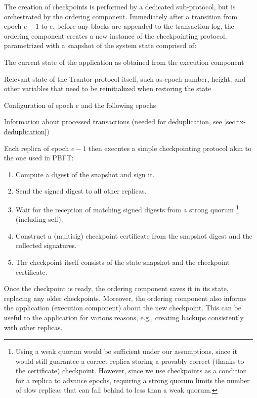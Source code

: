 \documentclass{article}
\begin{document}
The creation of checkpoints is performed by a dedicated sub-protocol, but is orchestrated by the ordering component.
Immediately after a transition from epoch $e-1$ to $e$, before any blocks are appended to the transaction log,
the ordering component creates a new instance of the checkpointing protocol,
parametrized with a snapshot of the system state comprised of:
\begin{compactitem}
\item The current state of the application as obtained from the execution component
\item Relevant state of the Trantor protocol itself,
such as epoch number, height, and other variables that need to be reinitialized when restoring the state
\item Configuration of epoch $e$ and the  following epochs
\item Information about processed transactions (needed for deduplication, see \cref{sec:tx-deduplication})
\end{compactitem}
Each replica of epoch $e-1$ then executes a simple checkpointing protocol akin to the one used in PBFT:
\begin{enumerate}

\item Compute a digest of the snapshot and sign it.

\item Send the signed digest to all other replicas.

\item Wait for the reception of matching signed digests from a strong quorum%
\footnote{Using a weak quorum would be sufficient under our assumptions,
since it would still guarantee a correct replica storing a provably correct (thanks to the certificate) checkpoint.
However, since we use checkpoints as a condition for a replica to advance epochs,
requiring a strong quorum limits the number of slow replicas that can fall behind to less than a weak quorum.}
(including self).

\item Construct a (multisig) checkpoint certificate from the snapshot digest and the collected signatures.

\item The checkpoint itself consists of the state snapshot and the checkpoint certificate.

\end{enumerate}

Once the checkpoint is ready, the ordering component saves it in its state, replacing any older checkpoints.
Moreover, the ordering component also informs the application (execution component) about the new checkpoint.
This can be useful to the application for various reasons, e.g., creating backups consistently with other replicas.
\end{document}
